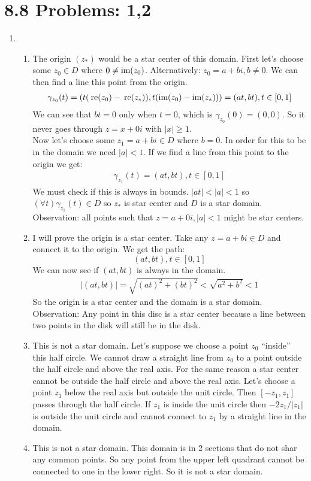 \documentclass{article}
\begin{document}
  \section{8.8 Problems: 1,2}
  \begin{enumerate}
    \item
      \begin{enumerate}[label=(\roman*)]
        \item
          The origin $(z_*)$ would be a star center of this domain. First let's choose some $z_0\in D$ where $0\neq\text{im}(z_0)$. Alternatively: $z_0=a+bi,b\neq0$. We can then find a line this point from the origin.
          \begin{align*}
            \gamma_{z_0}(t)=(t(\:\text{re}(z_0)-\:\text{re}(z_*)),t(\text{im}(z_0)-\text{im}(z_*)))=(at,bt),t\in[0,1]
          \end{align*}
          We can see that $bt=0$ only when $t=0$, which is $\gamma_{z_0}(0)=(0,0)$. So it never goes through $z=x+0i$ with $|x|\geq1$.\\
          Now let's choose some $z_1=a+bi\in D$ where $b=0$. In order for this to be in the domain we need $|a|<1$. If we find a line from this point to the origin we get:
          \begin{align*}
            \gamma_{z_1}(t)=(at,bt),t\in[0,1]
          \end{align*}
          We must check if this is always in bounds. $|at|<|a|<1$ so $(\forall t)\gamma_{z_1}(t)\in D$ so $z_*$ is star center and $D$ is a star domain. Observation: all points such that $z=a+0i,|a|<1$ might be star centers.
        \item
          I will prove the origin is a star center. Take any $z=a+bi\in D$ and connect it to the origin. We get the path:
          \[
            (at,bt),t\in[0,1]
          \]
          We can now see if $(at,bt)$ is always in the domain.
          \begin{align*}
            |(at,bt)|=\sqrt{(at)^2+(bt)^2}<\sqrt{a^2+b^2}<1
          \end{align*}
          So the origin is a star center and the domain is a star domain. Observation: Any point in this disc is a star center because a line between two points in the disk will still be in the disk.
        \item
          This is not a star domain. Let's suppose we choose a point $z_0$ ``inside'' this half circle. We cannot draw a straight line from $z_0$ to a point outside the half circle and above the real axis. For the same reason a star center cannot be outside the half circle and above the real axis. Let's choose a point $z_1$ below the real axis but outside the unit circle. Then $[-z_1,z_1]$ passes through the half circle. If $z_1$ is inside the unit circle then $-2z_1/|z_1|$ is outside the unit circle and cannot connect to $z_1$ by a straight line in the domain.
        \item
          This is not a star domain. This domain is in 2 sections that do not shar any common points. So any point from the upper left quadrant cannot be connected to one in the lower right. So it is not a star domain.


\end{enumerate}
\end{enumerate}
\end{document}
